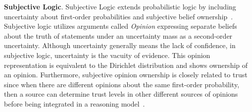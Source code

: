 


\vspace {.3cm}
\noindent
\textbf{Subjective Logic}.
Subjective Logic extends probabilistic logic by including uncertainty about first-order probabilities and subjective belief ownership~\cite{sl}. Subjective logic utilizes arguments called \emph{Opinion} expressing separate beliefs about the truth of statements under an uncertainty mass as a second-order uncertainty. Although uncertainty generally means the lack of confidence, in subjective logic, uncertainty is the vacuity of evidence. This opinion representation is equivalent to the Dirichlet distribution and shows ownership of an opinion. 
Furthermore, subjective opinion ownership is closely related to trust since when there are different opinions about the same first-order probability, then a source can determine trust levels in other different sources of opinions before being integrated in a reasoning model~\cite{sl}.


